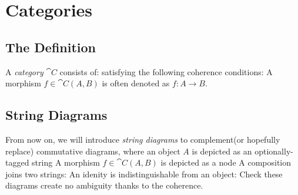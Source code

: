 
\section{Categories}

\subsection{The Definition}

A \emph{category} $\cat{C}$ consists of:
satisfying the following coherence conditions:
A morphism $f \in \cat{C}(A,B)$ is often denoted as
$
    f : A \to B
$.


\subsection{String Diagrams}

From now on, we will introduce \emph{string diagrams} %
to complement(or hopefully replace) commutative diagrams, where an object $A$ %
is depicted as an optionally-tagged string
A morphism $f \in \cat{C}(A,B)$ is depicted as a node
A composition joins two strings:
An idenity is indistinguishable from an object:
Check these diagrams create no ambiguity thanks to the coherence.


